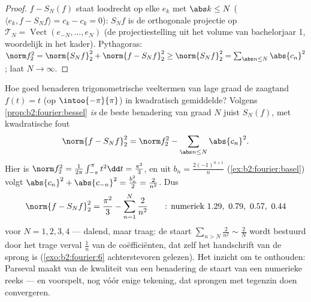\begin{proof}
$f - S_N(f)$ staat loodrecht op elke $e_k$ met $\abs k \leq N$
($\langle e_k, f - S_N f\rangle = c_k - c_k = 0$): $S_Nf$ is de
orthogonale projectie op $\mathcal{T}_N =
\operatorname{Vect}(e_{-N}, \dots, e_N)$ (de projectiestelling uit
het volume van bachelorjaar 1, woordelijk in het 
kader). Pythagoras: $\norm f_2^2 = \norm{S_Nf}_2^2 + \norm{f -
S_Nf}_2^2 \geq \norm{S_Nf}_2^2 = \sum_{\abs n \leq N}
\abs{c_n}^2$; laat $N \to \infty$.
\end{proof}

\begin{example}\label{ex:b2:fourier:bestapprox}
Hoe goed benaderen trigonometrische veeltermen van lage graad de
zaagtand $f(t) = t$ (op $\intoo{-\pi}{\pi}$) in kwadratisch
gemiddelde? Volgens \cref{prop:b2:fourier:bessel} \emph{is} de
beste benadering van graad $N$ juist $S_N(f)$, met kwadratische
fout
\[
\norm{f - S_Nf}_2^2 = \norm f_2^2 -
\sum_{\abs n\leq N}\abs{c_n}^2 .
\]
Hier is $\norm f_2^2 = \frac{1}{2\pi}\int_{-\pi}^\pi t^2\dd t =
\frac{\pi^2}{3}$, en uit $b_n = \frac{2(-1)^{n+1}}{n}$
(\cref{ex:b2:fourier:basel}) volgt $\abs{c_n}^2 + \abs{c_{-n}}^2 =
\frac{b_n^2}{2} = \frac{2}{n^2}$. Dus
\[
\norm{f - S_Nf}_2^2
= \frac{\pi^2}{3} - \sum_{n=1}^{N}\frac{2}{n^2}
\qquad\text{: numeriek } 1.29,\ 0.79,\ 0.57,\ 0.44
\]
voor $N = 1, 2, 3, 4$ --- dalend, maar traag: de staart
$\sum_{n>N}\frac2{n^2} \sim \frac2N$ wordt bestuurd door het trage
verval $\frac1n$ van de coëfficiënten, dat zelf het handschrift
van de sprong is (\cref{exo:b2:fourier:6} achterstevoren gelezen).
Het inzicht om te onthouden: Parseval maakt van de kwaliteit van
een benadering de staart van een numerieke reeks --- en voorspelt,
nog vóór enige tekening, dat sprongen  met tegenzin
doen convergeren.
\end{example}

